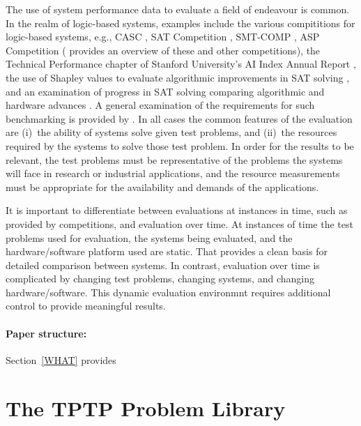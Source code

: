 \documentclass[runningheads]{llncs}
\begin{document}
The use of system performance data to evaluate a field of endeavour is common.
In the realm of logic-based systems, examples include
the various compititions for logic-based systems, e.g., CASC \cite{Sut16}, SAT Competition 
\cite{JL+12}, SMT-COMP \cite{BdS05}, ASP Competition \cite{CI+12} (\cite{BB+19} provides an 
overview of these and other competitions),
the Technical Performance chapter of Stanford University's AI Index Annual Report \cite{MF+23},
the use of Shapley values to evaluate algorithmic improvements in SAT solving \cite{FK+16,KF+19},
and
an examination of progress in SAT solving comparing algorithmic and hardware advances \cite{FHS20}.
A general examination of the requirements for such benchmarking is provided by \cite{BLW19}.
In all cases the common features of the evaluation are (i)~the ability of systems solve given test
problems, and (ii)~the resources required by the systems to solve those test problem.
In order for the results to be relevant, the test problems must be representative of the problems
the systems will face in research or industrial applications, and the resource measurements must
be appropriate for the availability and demands of the applications.

It is important to differentiate between evaluations at instances in time, such as provided by
competitions, and evaluation over time.
At instances of time the test problems used for evaluation, the systems being evaluated, and
the hardware/software platform used are static.
That provides a clean basis for detailed comparison between systems.
In contrast, evaluation over time is complicated by changing test problems, changing systems,
and changing hardware/software.
This dynamic evaluation environmnt requires additional control to provide meaningful results.

\paragraph{Paper structure:}
Section~\ref{WHAT} provides 

\section{The TPTP Problem Library}
\label{TPTP}
\end{document}
